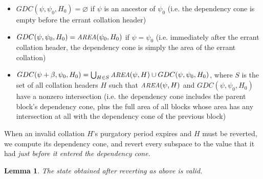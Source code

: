 \documentclass[11pt,a4paper]{article}
\makeatletter
\theoremstyle{plain}
\newtheorem{lem}[thm]{Lemma}
\theoremstyle{definition}
\theoremstyle{remark}
\newcommand{\ie}{i.e.\@\xspace}
\renewcommand{\emptyset}{\ensuremath{\varnothing}}
\newcommand{\makeintoafunction}[1]{\textit{\uppercase{\small #1}}}
\newcommand{\AREA}{\makeintoafunction{area}}
\makeatother
\begin{document}
\begin{itemize}
\item
$GDC(\psi, \psi_0, H_0) = \emptyset$ if $\psi$ is an ancestor of $\psi_0$ (\ie the dependency cone is empty before the errant collation header)
\item
$GDC(\psi, \psi_0, H_0) = \AREA(\psi_0, H_0)$ if $\psi = \psi_0$ (\ie immediately after the errant collation header, the dependency cone is simply the area of the errant collation)
\item
$GDC(\psi + \beta, \psi_0, H_0) = \bigcup_{H \in S} \AREA(\psi, H) \cup GDC(\psi, \psi_0, H_0)$, where $S$ is the set of all collation headers $H$ such that $\AREA(\psi, H)$ and $GDC(\psi, \psi_0, H_0)$ have a nonzero intersection (\ie the dependency cone includes the parent block's dependency cone, plus the full area of all blocks whose area has any intersection at all with the dependency cone of the previous block)
\end{itemize}

When an invalid collation $H$'s purgatory period expires and $H$ must be reverted, we compute its dependency cone, and revert every subspace to the value that it had \emph{just before it entered the dependency cone}.

\begin{lem}
The state obtained after reverting as above is valid.
\end{lem}
\end{document}
